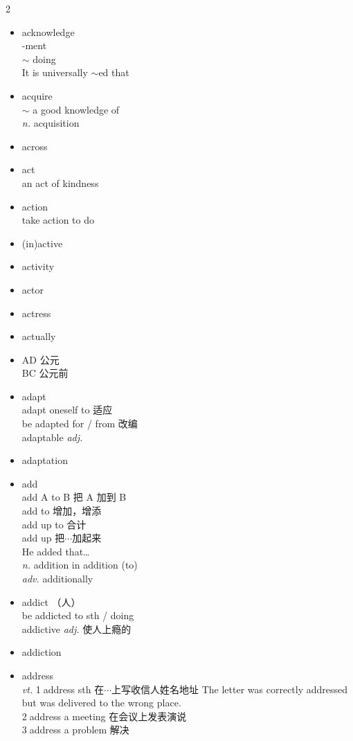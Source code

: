 \documentclass[../../book.tex]{subfiles}
\begin{document}
\begin{multicols}{2}
\begin{itemize}
\\acid rain
\item[-] acknowledge
\\-ment
\\$\sim$ doing
\\It is universally $\sim$ed that
\item[-] acquire
\\$\sim$ a good knowledge of
\\\emph{n.} acquisition
\item[-] across
\item[-] act
\\an act of kindness
\item[-] action
\\take action to do
\item[-] (in)active
\item[-] activity
\item[-] actor
\item[-] actress
\item[-] actually
\item[-] AD 公元
\\BC 公元前
\item[-] adapt
\\adapt oneself to 适应
\\be adapted for / from 改编
\\adaptable \emph{adj.}
\item[-] adaptation
\item[-] add
\\add A to B 把 A 加到 B
\\add to 增加，增添
\\add up to 合计
\\add up 把$\cdots$加起来
\\He added that\ldots
\\\emph{n.} addition in addition (to)
\\\emph{adv.} additionally
\item[-] addict （人）
\\be addicted to sth / doing
\\addictive \emph{adj.} 使人上瘾的
\item[-] addiction
\item[-] address
\\\emph{vt.} \textcircled{1}address sth 在$\cdots$上写收信人姓名地址 The letter was correctly addressed but was delivered to the wrong place.
\\\textcircled{2}address a meeting 在会议上发表演说
\\\textcircled{3}address a problem 解决

\end{itemize}
\end{multicols}
\end{document}
